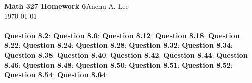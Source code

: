 \documentclass{article}
\begin{document}
    \noindent\textbf{Math 327 Homework 6}\hfill Anchu A. Lee\\
    \noindent\today\\\\
    \noindent\textbf{Question 8.2}:\newline
    \textbf{Question 8.6}:\newline
    \textbf{Question 8.12}:\newline
    \textbf{Question 8.18}:\newline
    \textbf{Question 8.22}:\newline
    \textbf{Question 8.24}:\newline
    \textbf{Question 8.28}:\newline
    \textbf{Question 8.32}:\newline
    \textbf{Question 8.34}:\newline
    \textbf{Question 8.38}:\newline
    \textbf{Question 8.40}:\newline
    \textbf{Question 8.42}:\newline
    \textbf{Question 8.44}:\newline
    \textbf{Question 8.46}:\newline
    \textbf{Question 8.48}:\newline
    \textbf{Question 8.50}:\newline
    \textbf{Question 8.51}:\newline
    \textbf{Question 8.52}:\newline
    \textbf{Question 8.54}:\newline
    \textbf{Question 8.64}:\newline
\end{document}
